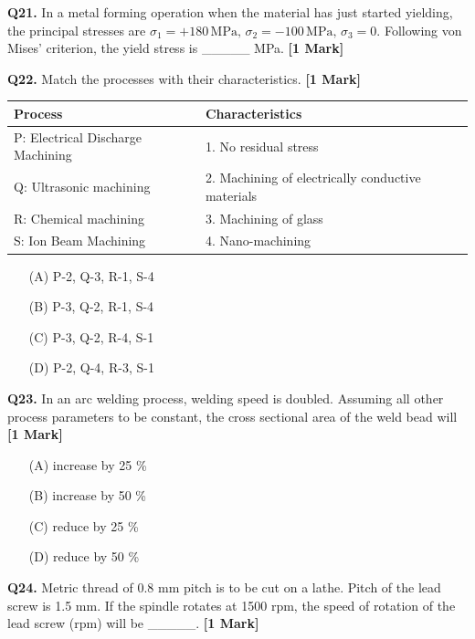 \documentclass[11pt]{article}
\newcommand{\questiona}[2]{
    \noindent\textbf{Q#2.} #1 \hfill \textbf{[1 Mark]}
}
\begin{document}
\questiona{In a metal forming operation when the material has just started yielding, the principal stresses are \( \sigma_1 = +180 \, \text{MPa}, \, \sigma_2 = -100 \, \text{MPa}, \, \sigma_3 = 0 \). Following von Mises' criterion, the yield stress is \_\_\_\_\_ MPa.}{21}
\vspace{0.5cm}

\questiona{Match the processes with their characteristics.}{22}
\begin{center}
\begin{tabular}{|l|l|}
\hline
Process & Characteristics \\
\hline
P: Electrical Discharge Machining & 1. No residual stress \\
Q: Ultrasonic machining & 2. Machining of electrically conductive materials \\
R: Chemical machining & 3. Machining of glass \\
S: Ion Beam Machining & 4. Nano-machining \\
\hline
\end{tabular}
\end{center}
\begin{enumerate}
    \item[(A)] P-2, Q-3, R-1, S-4  
    \item[(B)] P-3, Q-2, R-1, S-4  
    \item[(C)] P-3, Q-2, R-4, S-1  
    \item[(D)] P-2, Q-4, R-3, S-1
\end{enumerate}
\vspace{0.5cm}

\questiona{In an arc welding process, welding speed is doubled. Assuming all other process parameters to be constant, the cross sectional area of the weld bead will}{23}
\begin{enumerate}
    \item[(A)] increase by 25 \%  
    \item[(B)] increase by 50 \%  
    \item[(C)] reduce by 25 \%  
    \item[(D)] reduce by 50 \%
\end{enumerate}
\vspace{0.5cm}

\questiona{Metric thread of 0.8 mm pitch is to be cut on a lathe. Pitch of the lead screw is 1.5 mm. If the spindle rotates at 1500 rpm, the speed of rotation of the lead screw (rpm) will be \_\_\_\_\_.}{24}
\vspace{0.5cm}
\end{document}
